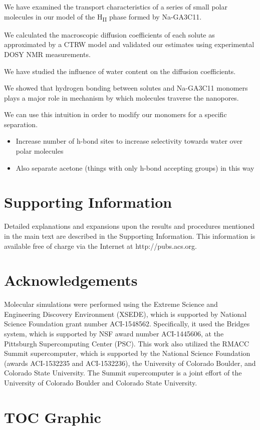 \documentclass{article}
\begin{document}
  We have examined the transport characteristics of a series of small polar
  molecules in our model of the H\textsubscript{II} phase formed by 
  Na-GA3C11.

  We calculated the macroscopic diffusion coefficients of each solute as 
  approximated by a CTRW model and validated our estimates using experimental
  DOSY NMR measurements.

  We have studied the influence of water content on the diffusion coefficients.

  We showed that hydrogen bonding between solutes and Na-GA3C11 monomers plays
  a major role in mechanism by which molecules traverse the nanopores. 

  We can use this intuition in order to modify our monomers for a specific 
  separation.
  \begin{itemize}
	\item Increase number of h-bond sites to increase selectivity towards water 
	over polar molecules
	\item Also separate acetone (things with only h-bond accepting groups) in this way
  \end{itemize}
  
 
  \section*{Supporting Information}

  Detailed explanations and expansions upon the results and procedures mentioned in
  the main text are described in the Supporting Information. This information is
  available free of charge via the Internet at http://pubs.acs.org.

  \section*{Acknowledgements}

  Molecular simulations were performed using the Extreme Science and
  Engineering Discovery Environment (XSEDE), which is supported by National
  Science Foundation grant number ACI-1548562. Specifically, it used the Bridges
  system, which is supported by NSF award number ACI-1445606, at the Pittsburgh
  Supercomputing Center (PSC). This work also utilized the RMACC Summit supercomputer,
  which is supported by the National Science Foundation (awards ACI-1532235 and
  ACI-1532236), the University of Colorado Boulder, and Colorado State
  University. The Summit supercomputer is a joint effort of the University of
  Colorado Boulder and Colorado State University.

  \clearpage
  

  \newpage

  \section*{TOC Graphic}
\end{document}
